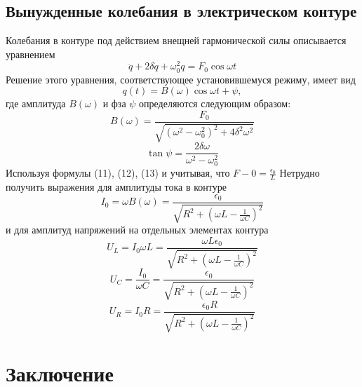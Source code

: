 \subsection{Вынужденные колебания в электрическом контуре} %
Колебания в контуре под действием внещней гармонической силы описывается уравнением
\begin{equation}
	\ddot{q}+2\delta\dot{q}+\omega_0^2 q= F_0\cos{\omega t}
\end{equation}
Решение этого уравнения, соответствующее установившемуся режиму, имеет вид
\begin{equation}
	q(t)=B(\omega)\cos{\omega t+\psi},
\end{equation}
где амплитуда $B(\omega)$ и фза $\psi$ определяются следующим образом:
\begin{equation}
	B(\omega)=\frac{F_0}{\sqrt{(\omega^2-\omega_0^2)^2+4\delta^2\omega^2}}
\end{equation}
\begin{equation}
	\tan{\psi}=\frac{2\delta\omega}{\omega^2-\omega_0^2}
\end{equation}
	Используя формулы (11), (12), (13) и учитывая, что $F-0=\frac{\epsilon_0}{L}$
Нетрудно получить выражения для амплитуды тока в контуре
\begin{equation}
	I_0=\omega B(\omega)=\frac{\epsilon_0}{\sqrt{R^2+(\omega L-\frac{1}{\omega C})^2}}
\end{equation}
и для амплитуд напряжений на отдельных элементах контура
\begin{equation}
	U_L=I_0\omega L=\frac{\omega L\epsilon_0}{\sqrt{R^2+(\omega L-\frac{1}{\omega C})^2}}
\end{equation}
\begin{equation}
	U_C=\frac{I_0}{\omega C}=\frac{\epsilon_0}{\sqrt{R^2+(\omega L-\frac{1}{\omega C})^2}}
\end{equation}
\begin{equation}
	U_R=I_0R=\frac{\epsilon_0R}{\sqrt{R^2+(\omega L-\frac{1}{\omega C})^2}}
\end{equation}

\newpage
\section{Заключение}

 
